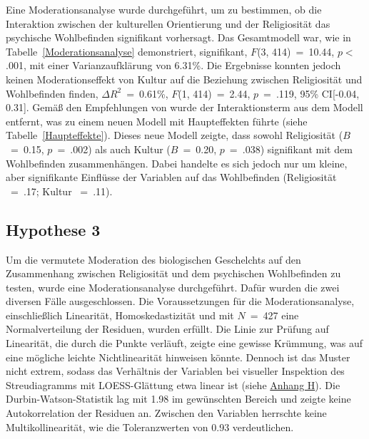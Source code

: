 
Eine Moderationsanalyse wurde durchgeführt, um zu bestimmen, ob die Interaktion zwischen der kulturellen Orientierung und der Religiosität das psychische Wohlbefinden signifikant vorhersagt. Das Gesamtmodell war, wie in Tabelle~\ref{Moderationsanalyse} demonstriert, signifikant, $F$(3, 414)~=~10.44, $p<$.001, mit einer Varianzaufklärung von 6.31\%. Die Ergebnisse konnten jedoch keinen Moderationseffekt von Kultur auf die Beziehung zwischen Religiosität und Wohlbefinden finden, $\Delta R^{2}$~=~0.61\%, $F$(1, 414)~=~2.44, $p$~=~.119, 95\% CI[-0.04, 0.31]. Gemäß den Empfehlungen von \textcite{Hayes2018} wurde der Interaktionsterm aus dem Modell entfernt, was zu einem neuen Modell mit Haupteffekten führte (siehe Tabelle~\ref{Haupteffekte}). Dieses neue Modell zeigte, dass sowohl Religiosität ($B$~=~0.15, $p$~=~.002) als auch Kultur ($B$~=~0.20, $p$~=~.038) signifikant mit dem Wohlbefinden zusammenhängen. Dabei handelte es sich jedoch nur um kleine, aber signifikante Einflüsse der Variablen auf das Wohlbefinden (Religiosität \textbeta~=~.17; Kultur \textbeta~=~.11).




\subsection{Hypothese 3}    \label{subsec_4.2.3}
Um die vermutete Moderation des biologischen Geschelchts auf den Zusammenhang zwischen Religiosität und dem psychischen Wohlbefinden zu testen, wurde eine Moderationsanalyse durchgeführt. Dafür wurden die zwei diversen Fälle ausgeschlossen. 
Die Voraussetzungen für die Moderationsanalyse, einschließlich Linearität, Homoskedastizität und mit $N$~=~427 eine Normalverteilung der Residuen, wurden erfüllt. Die Linie zur Prüfung auf Linearität, die durch die Punkte verläuft, zeigte eine gewisse Krümmung, was auf eine mögliche leichte Nichtlinearität hinweisen könnte. Dennoch ist das Muster nicht extrem, sodass das Verhältnis der Variablen bei visueller Inspektion des Streudiagramms mit LOESS-Glättung etwa linear ist (siehe \hyperref [H3_Voraussetzungen]{Anhang H}). 
Die Durbin-Watson-Statistik lag mit 1.98 im gewünschten Bereich und zeigte keine Autokorrelation der Residuen an. Zwischen den Variablen herrschte keine Multikollinearität, wie die Toleranzwerten von 0.93 verdeutlichen.

